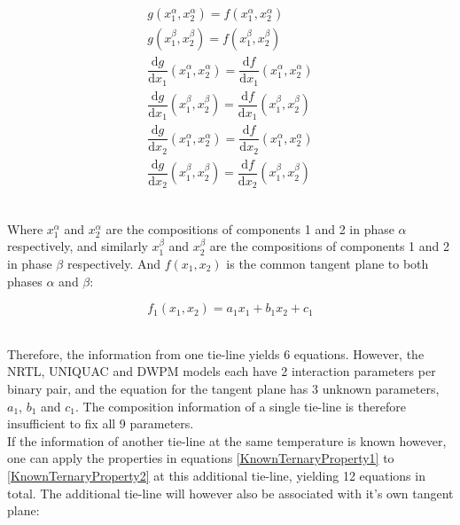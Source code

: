 \begin{eqnarray}
g\left(x_{1}^{\alpha}, x_{2}^{\alpha}\right) = f\left(x_{1}^{\alpha}, x_{2}^{\alpha}\right) \label{KnownTernaryProperty1} \\
g\left(x_{1}^{\beta}, x_{2}^{\beta}\right) = f\left(x_{1}^{\beta}, x_{2}^{\beta}\right)\\
\dfrac{\mathrm{d} g}{\mathrm{d}x_{1}}\left(x_{1}^{\alpha}, x_{2}^{\alpha}\right) = \dfrac{\mathrm{d} f}{\mathrm{d}x_{1}}\left(x_{1}^{\alpha}, x_{2}^{\alpha}\right)\\
\dfrac{\mathrm{d} g}{\mathrm{d}x_{1}}\left(x_{1}^{\beta}, x_{2}^{\beta}\right) = \dfrac{\mathrm{d} f}{\mathrm{d}x_{1}}\left(x_{1}^{\beta}, x_{2}^{\beta}\right)\\
\dfrac{\mathrm{d} g}{\mathrm{d}x_{2}}\left(x_{1}^{\alpha}, x_{2}^{\alpha}\right) = \dfrac{\mathrm{d} f}{\mathrm{d}x_{2}}\left(x_{1}^{\alpha}, x_{2}^{\alpha}\right)\\
\dfrac{\mathrm{d} g}{\mathrm{d}x_{2}}\left(x_{1}^{\beta}, x_{2}^{\beta}\right) = \dfrac{\mathrm{d} f}{\mathrm{d}x_{2}}\left(x_{1}^{\beta}, x_{2}^{\beta}\right) \label{KnownTernaryProperty2}
\end{eqnarray}\

Where $x_{1}^{\alpha}$ and $x_{2}^{\alpha}$ are the compositions of components 1 and 2 in phase $\alpha$ respectively, and similarly $x_{1}^{\beta}$ and $x_{2}^{\beta}$ are the compositions of components 1 and 2 in phase $\beta$ respectively. And $f\left(x_{1}, x_{2}\right)$ is the common tangent plane to both phases $\alpha$ and $\beta$:\

\begin{equation}
f_{1}\left(x_{1}, x_{2}\right) = a_{1}x_{1} + b_{1}x_{2} +c_{1} \label{TangentPlane13D}
\end{equation}\

Therefore, the information from one tie-line yields 6 equations. However, the NRTL, UNIQUAC and DWPM models each have 2 interaction parameters per binary pair, and the equation for the tangent plane has 3 unknown parameters, $a_{1}$, $b_{1}$ and $c_{1}$. The composition information of a single tie-line is therefore insufficient to fix all 9 parameters.\\

If the information of another tie-line at the same temperature is known however, one can apply the properties in equations \ref{KnownTernaryProperty1} to \ref{KnownTernaryProperty2} at this additional tie-line, yielding 12 equations in total. The additional tie-line will however also be associated with it's own tangent plane:\

